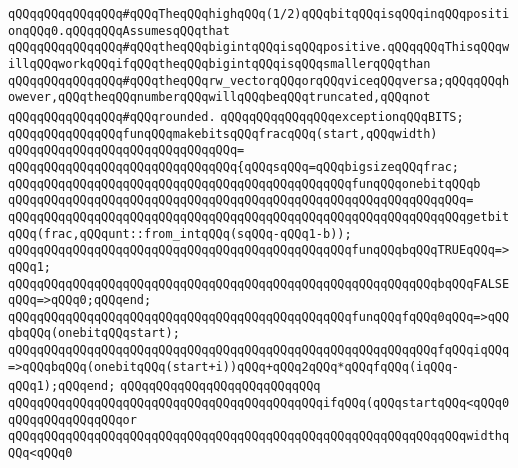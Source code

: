 \verb|qQQqqQQqqQQqqQQq#qQQqTheqQQqhighqQQq(1/2)qQQqbitqQQqisqQQqinqQQqpositionqQQq0.qQQqqQQqAssumesqQQqthat|\newline
\verb|qQQqqQQqqQQqqQQq#qQQqtheqQQqbigintqQQqisqQQqpositive.qQQqqQQqThisqQQqwillqQQqworkqQQqifqQQqtheqQQqbigintqQQqisqQQqsmallerqQQqthan|\newline
\verb|qQQqqQQqqQQqqQQq#qQQqtheqQQqrw_vectorqQQqorqQQqviceqQQqversa;qQQqqQQqhowever,qQQqtheqQQqnumberqQQqwillqQQqbeqQQqtruncated,qQQqnot|\newline
\verb|qQQqqQQqqQQqqQQq#qQQqrounded.|\newline
\newline
\verb|qQQqqQQqqQQqqQQqexceptionqQQqBITS;|\newline
\newline
\verb|qQQqqQQqqQQqqQQqfunqQQqmakebitsqQQqfracqQQq(start,qQQqwidth)|\newline
\verb|qQQqqQQqqQQqqQQqqQQqqQQqqQQqqQQq=|\newline
\verb|qQQqqQQqqQQqqQQqqQQqqQQqqQQqqQQq{qQQqsqQQq=qQQqbigsizeqQQqfrac;|\newline
\newline
\verb|qQQqqQQqqQQqqQQqqQQqqQQqqQQqqQQqqQQqqQQqqQQqqQQqfunqQQqonebitqQQqb|\newline
\verb|qQQqqQQqqQQqqQQqqQQqqQQqqQQqqQQqqQQqqQQqqQQqqQQqqQQqqQQqqQQqqQQq=|\newline
\verb|qQQqqQQqqQQqqQQqqQQqqQQqqQQqqQQqqQQqqQQqqQQqqQQqqQQqqQQqqQQqqQQqgetbitqQQq(frac,qQQqunt::from_intqQQq(sqQQq-qQQq1-b));|\newline
\newline
\verb|qQQqqQQqqQQqqQQqqQQqqQQqqQQqqQQqqQQqqQQqqQQqqQQqfunqQQqbqQQqTRUEqQQq=>qQQq1;|\newline
\verb|qQQqqQQqqQQqqQQqqQQqqQQqqQQqqQQqqQQqqQQqqQQqqQQqqQQqqQQqqQQqbqQQqFALSEqQQq=>qQQq0;qQQqend;|\newline
\newline
\verb|qQQqqQQqqQQqqQQqqQQqqQQqqQQqqQQqqQQqqQQqqQQqqQQqfunqQQqfqQQq0qQQq=>qQQqbqQQq(onebitqQQqstart);|\newline
\verb|qQQqqQQqqQQqqQQqqQQqqQQqqQQqqQQqqQQqqQQqqQQqqQQqqQQqqQQqqQQqfqQQqiqQQq=>qQQqbqQQq(onebitqQQq(start+i))qQQq+qQQq2qQQq*qQQqfqQQq(iqQQq-qQQq1);qQQqend;|\newline
\newline
\verb|qQQqqQQqqQQqqQQqqQQqqQQqqQQq|\newline
\verb|qQQqqQQqqQQqqQQqqQQqqQQqqQQqqQQqqQQqqQQqqQQqifqQQq(qQQqstartqQQq<qQQq0qQQqqQQqqQQqqQQqor|\newline
\verb|qQQqqQQqqQQqqQQqqQQqqQQqqQQqqQQqqQQqqQQqqQQqqQQqqQQqqQQqqQQqqQQqwidthqQQq<qQQq0|\newline
